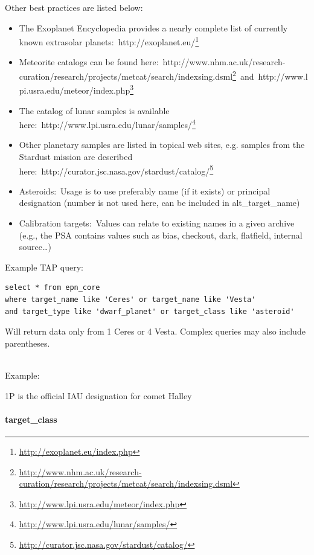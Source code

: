 \documentclass[11pt,a4paper]{ivoa}
\begin{document}
Other best practices are listed below:

\begin{itemize}
\item The Exoplanet Encyclopedia provides a nearly complete list of currently known extrasolar planets: http://exoplanet.eu/\footnote{\url{http://exoplanet.eu/index.php}}
\item Meteorite catalogs can be found here: http://www.nhm.ac.uk/research-curation/research/projects/metcat/search/indexsing.dsml\footnote{\url{http://www.nhm.ac.uk/research-curation/research/projects/metcat/search/indexsing.dsml}} and http://www.lpi.usra.edu/meteor/index.php\footnote{\url{http://www.lpi.usra.edu/meteor/index.php}}
\item The catalog of lunar samples is available here: http://www.lpi.usra.edu/lunar/samples/\footnote{\url{http://www.lpi.usra.edu/lunar/samples/}}
\item Other planetary samples are listed in topical web sites, e.g. samples from the Stardust mission are described here: http://curator.jsc.nasa.gov/stardust/catalog/\footnote{\url{http://curator.jsc.nasa.gov/stardust/catalog/}}
\item Asteroids: Usage is to use preferably name (if it exists) or principal designation (number is not used here, can be included in alt\_target\_name)
\item Calibration targets: Values can relate to existing names in a given archive (e.g., the PSA contains values such as bias, checkout, dark, flatfield, internal source…)
\end{itemize}

Example TAP query:






\begin{verbatim}
select * from epn_core 
where target_name like 'Ceres' or target_name like 'Vesta' 
and target_type like 'dwarf_planet' or target_class like 'asteroid'
\end{verbatim}




Will return data only from 1 Ceres or 4 Vesta. Complex queries may also include parentheses.

\\

Example:

1P is the official IAU designation for comet Halley

\paragraph{target\_class}
\end{document}
